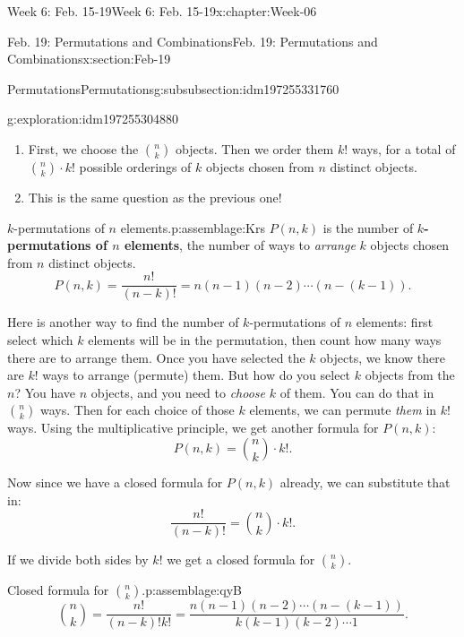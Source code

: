 \documentclass[oneside,10pt,]{book}
\newcommand{\terminology}[1]{\textbf{#1}}
\numberwithin{equation}{section}
\begin{document}
\begin{chapterptx}{Week 6: Feb. 15-19}{}{Week 6: Feb. 15-19}{}{}{x:chapter:Week-06}
\begin{sectionptx}{Feb. 19: Permutations and Combinations}{}{Feb. 19: Permutations and Combinations}{}{}{x:section:Feb-19}
\begin{subsubsectionptx}{Permutations}{}{Permutations}{}{}{g:subsubsection:idm197255331760}
\begin{exploration}{}{g:exploration:idm197255304880}
\begin{enumerate}
\item{}First, we choose the \(\binom{n}{k}\) objects. Then we order them \(k!\) ways, for a total of \(\binom{n}{k}\cdot k!\) possible orderings of \(k\) objects chosen from \(n\) distinct objects.%
\item{}This is the same question as the previous one!%
\end{enumerate}
\end{exploration}%
\begin{assemblage}{\(k\)-permutations of \(n\) elements.}{p:assemblage:Krs}%
\(P(n,k)\) is the number of \terminology{\(k\)-permutations of \(n\) elements}, the number of ways to \emph{arrange} \(k\) objects chosen from \(n\) distinct objects.%
\begin{equation*}
P(n,k) = \frac{n!}{(n-k)!} = n(n-1)(n-2)\cdots (n-(k-1))\text{.}
\end{equation*}
%
\end{assemblage}
Here is another way to find the number of \(k\)-permutations of \(n\) elements: first select which \(k\) elements will be in the permutation, then count how many ways there are to arrange them. Once you have selected the \(k\) objects, we know there are \(k!\) ways to arrange (permute) them. But how do you select \(k\) objects from the \(n\)? You have \(n\) objects, and you need to \emph{choose} \(k\) of them. You can do that in \({n \choose k}\) ways. Then for each choice of those \(k\) elements, we can permute \emph{them} in \(k!\) ways. Using the multiplicative principle, we get another formula for \(P(n,k)\):%
\begin{equation*}
P(n,k) = {n \choose k}\cdot k!\text{.}
\end{equation*}
%
\par
Now since we have a closed formula for \(P(n,k)\) already, we can substitute that in:%
\begin{equation*}
\frac{n!}{(n-k)!} = {n \choose k} \cdot k!\text{.}
\end{equation*}
%
\par
If we divide both sides by \(k!\) we get a closed formula for \({n \choose k}\).%
\begin{assemblage}{Closed formula for \({n \choose k}\).}{p:assemblage:qyB}%
%
\begin{equation*}
{n \choose k} = \frac{n!}{(n-k)!k!} = \frac{n(n-1)(n-2)\cdots(n-(k-1))}{k(k-1)(k-2)\cdots 1}\text{.}
\end{equation*}
%
\end{assemblage}

\end{subsubsectionptx}
\end{sectionptx}
\end{chapterptx}
\end{document}
